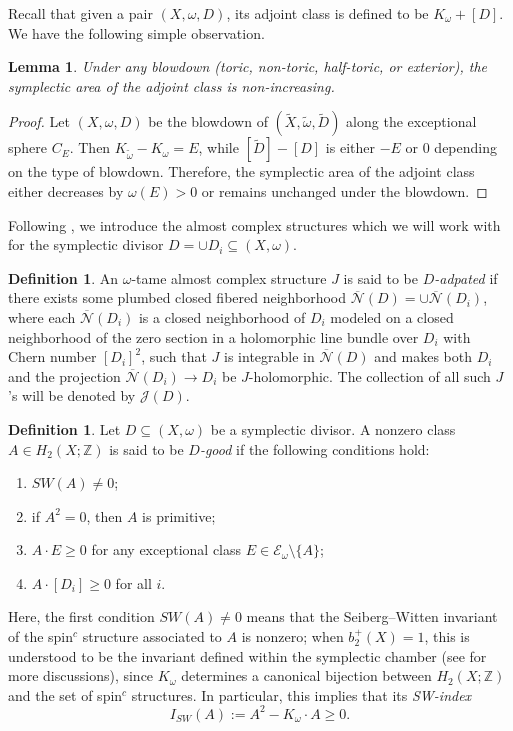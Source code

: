\documentclass[11pt]{article}
\newtheorem{lemma}[theorem]{Lemma}
\theoremstyle{definition}
\newtheorem{definition}[theorem]{Definition}
\theoremstyle{remark}
\begin{document}
Recall that given a pair $(X,\omega,D)$, its adjoint class is defined to be $K_\omega+[D]$. We have the following simple observation.

\begin{lemma}\label{lem:blowdownarea}
Under any blowdown (toric, non-toric, half-toric, or exterior), the symplectic area of the adjoint class is non-increasing.
\end{lemma}
\begin{proof}
 Let $(X,\omega,D)$ be the blowdown of $(\tilde{X},\tilde{\omega},\tilde{D})$ along the exceptional sphere $C_E$. Then $K_{\tilde{\omega}}-K_{\omega}=E$, while $[\tilde{D}]-[D]$ is either $-E$ or $0$ depending on the type of blowdown. Therefore, the symplectic area of the adjoint class either decreases by $\omega(E)>0$ or remains unchanged under the blowdown.
\end{proof}

Following \cite{MO15}, we introduce the almost complex structures which we will work with for the symplectic divisor $D=\cup D_i\subseteq (X,\omega)$.
\begin{definition}
    An $\omega$-tame almost complex structure $J$ is said to be \emph{$D$-adpated} if there exists some plumbed closed fibered neighborhood $\overline{\mathcal{N}}(D)=\cup\overline{\mathcal{N}}(D_i)$, where each $\overline{\mathcal{N}}(D_i)$ is a closed neighborhood of $D_i$ modeled on a closed neighborhood of the zero section in a holomorphic line bundle over $D_i$ with Chern number $[D_i]^2$, such that $J$ is integrable in $\overline{\mathcal{N}}(D)$ and makes both $D_i$ and the projection $\overline{\mathcal{N}}(D_i)\rightarrow D_i$ be $J$-holomorphic. The collection of all such $J$'s will be denoted by $\mathcal{J}(D)$.
\end{definition}


\begin{definition}\label{def:Dgood}
    Let $D\subseteq (X,\omega)$ be a symplectic divisor. A nonzero class $A\in H_2(X;\mathbb{Z})$ is said to be \emph{$D$-good} if the following conditions hold:
    \begin{enumerate}[nosep]
        \item $SW(A)\neq 0$;
        \item if $A^2=0$, then $A$ is primitive;
        \item $A\cdot E\geq 0$ for any exceptional class $E\in\mathcal{E}_\omega\setminus \{A\}$;
        \item $A\cdot[D_i]\geq 0$ for all $i$.
    \end{enumerate}
\end{definition}
Here, the first condition $SW(A)\neq 0$ means that the Seiberg--Witten invariant of the spin$^{c}$ structure associated to $A$ is nonzero; when $b_2^+(X)=1$, this is understood to be the invariant defined within the symplectic chamber (see \cite[Section 2.2]{LN25} for more discussions), since $K_\omega$ determines a canonical bijection between $H_2(X;\mathbb{Z})$ and the set of spin$^c$ structures. In particular, this implies that its \emph{SW-index}
\[I_{SW}(A):=A^2-K_\omega\cdot A\geq 0.\] 
\end{document}
